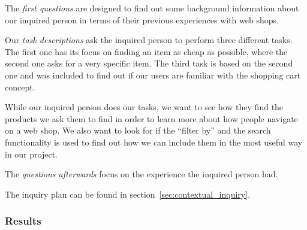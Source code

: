 The \textit{first questions} are designed to find out some background information about our inquired person in terms of their previous experiences with web shops. 

Our \textit{task descriptions} ask the inquired person to perform three different tasks. The first one has its focus on finding an item as cheap as possible, where the second one asks for a very specific item. The third task is based on the second one and was included to find out if our users are familiar with the shopping cart concept. 

While our inquired person does our tasks, we want to see how they find the products we ask them to find in order to learn more about how people navigate on a web shop. We also want to look for if the ``filter by'' and the search functionality is used to find out how we can include them in the most useful way in our project. 

The \textit{questions afterwards} focus on the experience the inquired person had.

The inquiry plan can be found in section~\ref{sec:contextual_inquiry}.

\subsubsection{Results}


